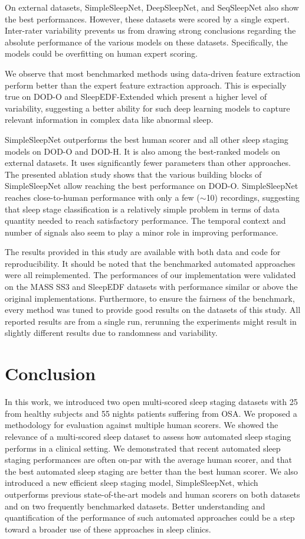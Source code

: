 \documentclass[journal]{IEEEtran}
\begin{document}
On external datasets, SimpleSleepNet, DeepSleepNet, and SeqSleepNet also show the best performances. However, these datasets were scored by a single expert. Inter-rater variability prevents us from drawing strong conclusions regarding the absolute performance of the various models on these datasets. Specifically, the models could be overfitting on human expert scoring.

We observe that most benchmarked methods using data-driven feature extraction perform better than the expert feature extraction approach. This is especially true on DOD-O and SleepEDF-Extended which present a higher level of variability, suggesting a better ability for such deep learning models to capture relevant information in complex data like abnormal sleep.

SimpleSleepNet outperforms the best human scorer and all other sleep staging models on DOD-O and DOD-H. It is also among the best-ranked models on external datasets. It uses significantly fewer parameters than other approaches. The presented ablation study shows that the various building blocks of SimpleSleepNet allow reaching the best performance on DOD-O. SimpleSleepNet reaches close-to-human performance with only a few ($\sim$10) recordings, suggesting that sleep stage classification is a relatively simple problem in terms of data quantity needed to reach satisfactory performance. The temporal context and number of signals also seem to play a minor role in improving performance.

The results provided in this study are available with both data and code for reproducibility. It should be noted that the benchmarked automated approaches were all reimplemented. The performances of our implementation were validated on the MASS SS3 and SleepEDF datasets with performance similar or above the original implementations.
Furthermore, to ensure the fairness of the benchmark, every method was tuned to provide good results on the datasets of this study. All reported results are from a single run, rerunning the experiments might result in slightly different results due to randomness and variability. 
\section{Conclusion}
In this work, we introduced two open multi-scored sleep staging datasets with 25 from healthy subjects and 55 nights patients suffering from OSA. We proposed a methodology for evaluation against multiple human scorers. We showed the relevance of a multi-scored sleep dataset to assess how automated sleep staging performs in a clinical setting. We demonstrated that recent automated sleep staging performances are often on-par with the average human scorer, and that the best automated sleep staging are better than the best human scorer. We also introduced a new efficient sleep staging model, SimpleSleepNet, which outperforms previous state-of-the-art models and human scorers on both datasets and on two frequently benchmarked datasets. Better understanding and quantification of the performance of such automated approaches could be a step toward a broader use of these approaches in sleep clinics.
\end{document}
